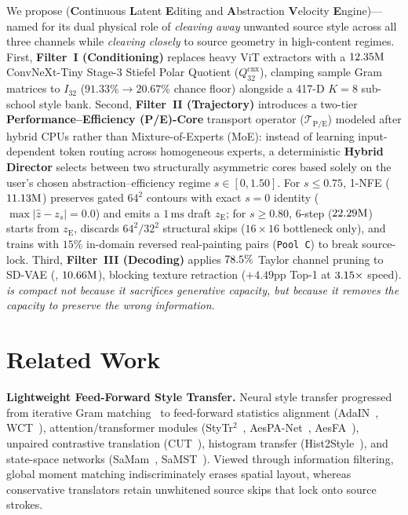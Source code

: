\documentclass[conference]{IEEEtran}
\begin{document}
We propose \textbf{\method} (\textbf{C}ontinuous \textbf{L}atent \textbf{E}diting and \textbf{A}bstraction \textbf{V}elocity \textbf{E}ngine)---named for its dual physical role of \emph{cleaving away} unwanted source style across all three channels while \emph{cleaving closely} to source geometry in high-content regimes. First, \textbf{Filter~I (Conditioning)} replaces heavy ViT extractors with a $12.35\text{M}$ ConvNeXt-Tiny Stage-3 Stiefel Polar Quotient ($Q_{32}^{\mathrm{cnx}}$), clamping sample Gram matrices to $I_{32}$ ($91.33\%\!\to\!20.67\%$ chance floor) alongside a 417-D $K=8$ sub-school style bank. Second, \textbf{Filter~II (Trajectory)} introduces a two-tier \textbf{Performance--Efficiency (P/E)-Core} transport operator ($\mathcal{T}_{\mathrm{P/E}}$) modeled after hybrid CPUs rather than Mixture-of-Experts (MoE): instead of learning input-dependent token routing across homogeneous experts, a deterministic \textbf{Hybrid Director} selects between two structurally asymmetric cores based solely on the user's chosen abstraction--efficiency regime $s\in[0,1.50]$. For $s\le 0.75$, 1-NFE \textbf{\methodecore} ($11.13\text{M}$) preserves gated $64^2$ contours with exact $s=0$ identity ($\max\lvert\hat{z}-z_s\rvert=0.0$) and emits a $1\,\text{ms}$ draft $z_{\mathrm{E}}$; for $s\ge 0.80$, 6-step \textbf{\methodpcore} ($22.29\text{M}$) starts from $z_{\mathrm{E}}$, discards $64^2/32^2$ structural skips ($16\times 16$ bottleneck only), and trains with $15\%$ in-domain reversed real-painting pairs (\texttt{Pool C}) to break source-lock. Third, \textbf{Filter~III (Decoding)} applies $78.5\%$ Taylor channel pruning to SD-VAE (\textbf{\methoddec}, $10.66\text{M}$), blocking texture retraction ($+4.49\text{pp}$ Top-1 at $3.15\times$ speed). \emph{\textbf{\method} is compact not because it sacrifices generative capacity, but because it removes the capacity to preserve the wrong information.}

\section{Related Work}
\label{sec:related}

\textbf{Lightweight Feed-Forward Style Transfer.}
Neural style transfer progressed from iterative Gram matching~\cite{gatys2016image,simonyan2014vgg} to feed-forward statistics alignment (AdaIN~\cite{huang2017arbitrary}, WCT~\cite{li2017universal}), attention/transformer modules (StyTr$^2$~\cite{deng2022stytr2}, AesPA-Net~\cite{hong2023aespa}, AesFA~\cite{kwon2024aesfa}), unpaired contrastive translation (CUT~\cite{park2020cut}), histogram transfer (Hist2Style~\cite{afifi2021histogan}), and state-space networks (SaMam~\cite{liu2024samam}, SaMST~\cite{liu2024samst}). Viewed through information filtering, global moment matching indiscriminately erases spatial layout, whereas conservative translators retain unwhitened source skips that lock onto source strokes.
\end{document}
